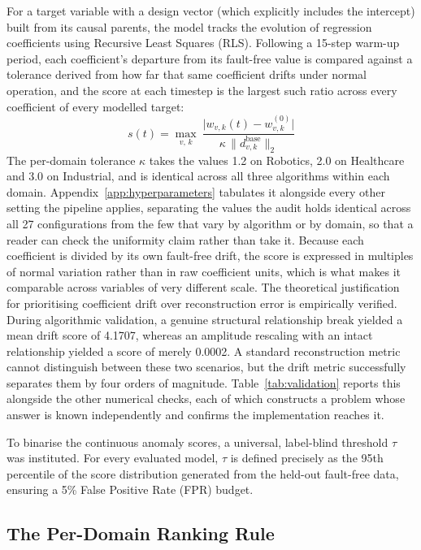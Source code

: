 For a target variable with a design vector (which explicitly includes the intercept) built from its causal parents, the model tracks the evolution of regression coefficients using Recursive Least Squares (RLS). Following a 15-step warm-up period, each coefficient's departure from its fault-free value is compared against a tolerance derived from how far that same coefficient drifts under normal operation, and the score at each timestep is the largest such ratio across every coefficient of every modelled target:
$$s(t) = \max_{v,\,k}\ \frac{\bigl| w_{v,k}(t) - w_{v,k}^{(0)} \bigr|}{\kappa \, \bigl\lVert d^{\text{base}}_{v,k} \bigr\rVert_2}$$
The per-domain tolerance $\kappa$ takes the values 1.2 on Robotics, 2.0 on Healthcare and 3.0 on Industrial, and is identical across all three algorithms within each domain. Appendix~\ref{app:hyperparameters} tabulates it alongside every other setting the pipeline applies, separating the values the audit holds identical across all 27 configurations from the few that vary by algorithm or by domain, so that a reader can check the uniformity claim rather than take it. Because each coefficient is divided by its own fault-free drift, the score is expressed in multiples of normal variation rather than in raw coefficient units, which is what makes it comparable across variables of very different scale.
The theoretical justification for prioritising coefficient drift over reconstruction error is empirically verified. During algorithmic validation, a genuine structural relationship break yielded a mean drift score of 4.1707, whereas an amplitude rescaling with an intact relationship yielded a score of merely 0.0002. A standard reconstruction metric cannot distinguish between these two scenarios, but the drift metric successfully separates them by four orders of magnitude. Table~\ref{tab:validation} reports this alongside the other numerical checks, each of which constructs a problem whose answer is known independently and confirms the implementation reaches it.



To binarise the continuous anomaly scores, a universal, label-blind threshold $\tau$ was instituted. For every evaluated model, $\tau$ is defined precisely as the 95th percentile of the score distribution generated from the held-out fault-free data, ensuring a 5\% False Positive Rate (FPR) budget.

\subsection{The Per-Domain Ranking Rule}
\label{sec:ranking-rule}

